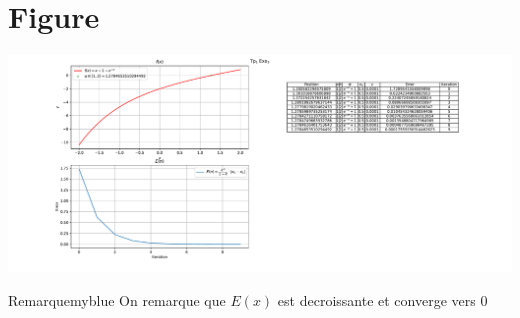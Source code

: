 \section{Figure}

\begin{center}
    \includegraphics[height=0.35\textheight]{Exercices/EX3/fig.pdf}
\end{center}

\vspace{1cm}
\begin{prettyBox}{Remarque}{myblue}
On remarque que \(E(x)\) est decroissante et converge vers 0
\end{prettyBox}
